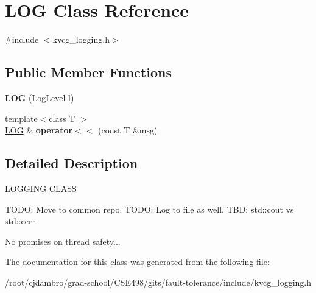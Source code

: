 \hypertarget{classLOG}{\section{L\-O\-G Class Reference}
\label{classLOG}
}


{\ttfamily \#include $<$kvcg\-\_\-logging.\-h$>$}

\subsection*{Public Member Functions}
\begin{DoxyCompactItemize}
\item 
\hypertarget{classLOG_a04ef340e098cf005c9d951695e8915ef}{{\bfseries L\-O\-G} (Log\-Level l)}\label{classLOG_a04ef340e098cf005c9d951695e8915ef}

\item 
\hypertarget{classLOG_ada24e4a188406cd1e46d08c0f71c1958}{{\footnotesize template$<$class T $>$ }\\\hyperlink{classLOG}{L\-O\-G} \& {\bfseries operator$<$$<$} (const T \&msg)}\label{classLOG_ada24e4a188406cd1e46d08c0f71c1958}

\end{DoxyCompactItemize}


\subsection{Detailed Description}
L\-O\-G\-G\-I\-N\-G C\-L\-A\-S\-S

T\-O\-D\-O\-: Move to common repo. T\-O\-D\-O\-: Log to file as well. T\-B\-D\-: std\-::cout vs std\-::cerr

No promises on thread safety... 

The documentation for this class was generated from the following file\-:\begin{DoxyCompactItemize}
\item 
/root/cjdambro/grad-\/school/\-C\-S\-E498/gits/fault-\/tolerance/include/kvcg\-\_\-logging.\-h\end{DoxyCompactItemize}
